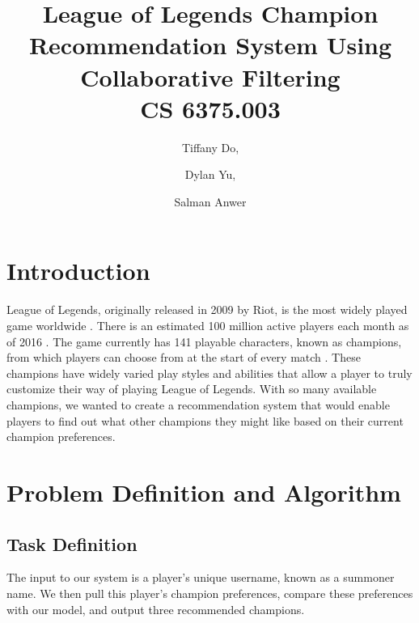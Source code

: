 \documentclass [11pt]{IEEEtran}
\title{League of Legends Champion Recommendation System Using Collaborative Filtering\\ {\large CS 6375.003}}
\author{Tiffany Do, \and Dylan Yu, \and Salman Anwer}
\begin{document}
\maketitle
\section{Introduction}
League of Legends, originally released in 2009 by Riot, is the most widely played game worldwide \cite{gaudiosi_2013}. There is an estimated 100 million active players each month as of 2016 \cite{volk_2016}. The game currently has 141 playable characters, known as champions, from which players can choose from at the start of every match \cite{champlist}. These champions have widely varied play styles and abilities that allow a player to truly customize their way of playing League of Legends. With so many available champions, we wanted to create a recommendation system that would enable players to find out what other champions they might like based on their current champion preferences.

\section{Problem Definition and Algorithm}
\subsection{Task Definition}
The input to our system is a player’s unique username, known as a summoner name. We then pull this player’s champion preferences, compare these preferences with our model, and output three recommended champions.
\end{document}
